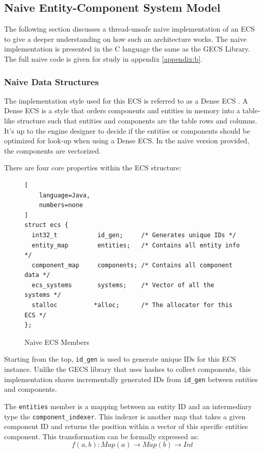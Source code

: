 \subsection{Naive Entity-Component System Model}
\label{sec:ecs_naive}
The following section discusses a thread-unsafe naive implementation of an ECS to give a deeper understanding on how such an architecture works. The naive implementation is presented in the C language the same as the GECS Library. The full naive code is given for study in appendix \ref{appendix:b}.

\subsubsection{Naive Data Structures}
The implementation style used for this ECS is referred to as a Dense ECS \cite{EnTT_SparseSets}. A Dense ECS is a style that orders components and entities in memory into a table-like structure such that entities and components are the table rows and columns. It's up to the engine designer to decide if the entities or components should be optimized for look-up when using a Dense ECS. In the naive version provided, the components are vectorized.

There are four core properties within the ECS structure:

\begin{figure}[H]
\begin{lstlisting}[
    language=Java,
    numbers=none
]
struct ecs {
  int32_t           id_gen;     /* Generates unique IDs */
  entity_map        entities;   /* Contains all entity info */
  component_map     components; /* Contains all component data */
  ecs_systems       systems;    /* Vector of all the systems */
  stalloc          *alloc;      /* The allocator for this ECS */
};
\end{lstlisting}
    \caption{Naive ECS Members}
    \label{code:naive_ecs_data}
\end{figure}

Starting from the top, \texttt{id\_gen} is used to generate unique IDs for this ECS instance. Unlike the GECS library that uses hashes to collect components, this implementation shares incrementally generated IDs from \texttt{id\_gen} between entities and components.

The \texttt{entities} member is a mapping between an entity ID and an intermediary type the \texttt{component\_indexer}. This indexer is another map that takes a given component ID and returns the position within a vector of this specific entities component. This transformation can be formally expressed as:
\begin{equation*}
    f(a, b) : Map(a) \rightarrow Map(b) \rightarrow Int
\end{equation*}

